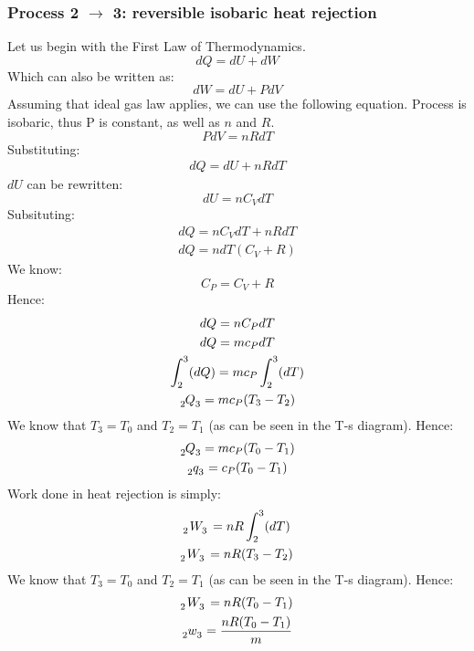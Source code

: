 \documentclass[12pt]{article}
\numberwithin{equation}{section}
\begin{document}
\begin{flushleft}
\subsubsection*{Process 2 $\rightarrow$ 3: reversible isobaric heat rejection}
Let us begin with the First Law of Thermodynamics.
\begin{equation}
  dQ = dU + dW
\end{equation}
Which can also be written as:
\begin{equation}
  dW = dU + PdV
\end{equation}
Assuming that ideal gas law applies, we can use the following equation. Process is isobaric, thus P is constant, as well as $n$ and $R$.
\begin{equation}
  PdV = nRdT
\end{equation}
Substituting:
\begin{gather}
  dQ = dU + nRdT
\end{gather}
$dU$ can be rewritten:
\begin{equation}
  dU = nC_V dT 
\end{equation}
Subsituting:
\begin{gather}
  dQ = nC_V dT + nRdT\\
  dQ = ndT (C_V + R)
\end{gather}
We know:
\begin{equation}
  C_P = C_V +R 
\end{equation}
Hence:
\begin{gather}
  dQ = nC_P dT\\
  dQ = mc_P dT\\
  \int_2^3 (dQ) = mc_P \int_2^3 (dT)\\
  \tensor[_2]{Q}{_3} = mc_P (T_3 - T_2)\\
\end{gather}
We know that $T_3 = T_0$ and $T_2 = T_1$ (as can be seen in the T-s diagram). Hence:
\begin{gather}
  \tensor[_2]{Q}{_3} = mc_P (T_0 - T_1)\\
  \tensor[_2]{q}{_3} = c_P (T_0 - T_1)
\end{gather}
Work done in heat rejection is simply:
\begin{gather}
  \tensor[_2]{W}{_3} = nR\int_2^3(dT)\\
  \tensor[_2]{W}{_3} = nR(T_3 - T_2)\\
\end{gather}
We know that $T_3 = T_0$ and $T_2 = T_1$ (as can be seen in the T-s diagram). Hence:
\begin{gather}
  \tensor[_2]{W}{_3} = nR(T_0 - T_1)\\
  \tensor[_2]{w}{_3} = \frac{nR(T_0 - T_1)}{m}
\end{gather}

\end{flushleft}
\end{document}
